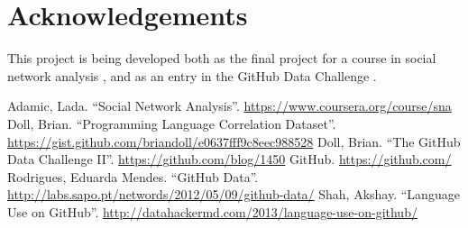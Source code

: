\documentclass[twocolumn]{article}
\begin{document}
\section*{Acknowledgements}
This project is being developed both as the final project for a course in social
network analysis \cite{snacourse}, and as an entry in the GitHub Data Challenge
\cite{doll13}.

\begin{thebibliography}{9}
    Adamic, Lada. ``Social Network Analysis''.
    \url{https://www.coursera.org/course/sna}
    Doll, Brian. ``Programming Language Correlation Dataset''.
    \url{https://gist.github.com/briandoll/e0637fff9c8eec988528}
    Doll, Brian. ``The GitHub Data Challenge II''.
    \url{https://github.com/blog/1450}
    GitHub. \url{https://github.com/}
    Rodrigues, Eduarda Mendes. ``GitHub Data''.
    \url{http://labs.sapo.pt/networds/2012/05/09/github-data/}
    Shah, Akshay. ``Language Use on GitHub''.
    \url{http://datahackermd.com/2013/language-use-on-github/}
\end{thebibliography}
\end{document}
